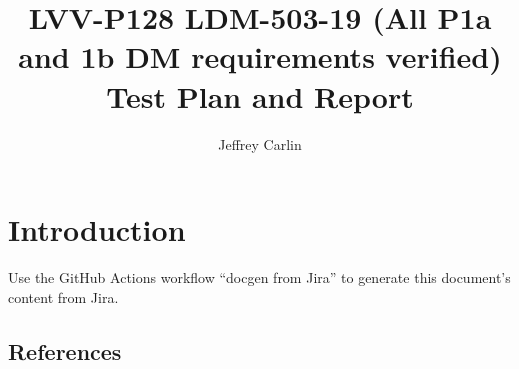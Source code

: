 \documentclass[DM,lsstdraft,toc]{lsstdoc}
\begin{document}
\def\milestoneName{LDM-503-19 (All P1a and 1b DM requirements verified)}
\def\milestoneId{LVV-P128}
\def\product{Data Management}


\title{LVV-P128 LDM-503-19 (All P1a and 1b DM requirements verified) Test Plan and Report}
\setDocRef{\lsstDocType-\lsstDocNum}
\date{\vcsDate}
\author{Jeffrey Carlin}




\maketitle

\section{Introduction}
Use the GitHub Actions workflow ``docgen from Jira'' to generate this document's content from Jira.

\subsection{References}
\label{sect:references}
\renewcommand{\refname}{}




\end{document}

